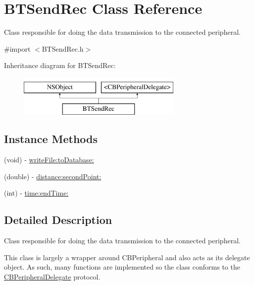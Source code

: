 \hypertarget{interfaceBTSendRec}{\section{B\-T\-Send\-Rec Class Reference}
\label{interfaceBTSendRec}
}


Class responsible for doing the data transmission to the connected peripheral.  




{\ttfamily \#import $<$B\-T\-Send\-Rec.\-h$>$}

Inheritance diagram for B\-T\-Send\-Rec\-:\begin{figure}[H]
\begin{center}
\leavevmode
\includegraphics[height=2.000000cm]{interfaceBTSendRec}
\end{center}
\end{figure}
\subsection*{Instance Methods}
\begin{DoxyCompactItemize}
\item 
(void) -\/ \hyperlink{interfaceBTSendRec_ac2435c7aa9df21d6d3ffc2b570c15fb7}{write\-File\-:to\-Database\-:}
\item 
(double) -\/ \hyperlink{interfaceBTSendRec_afebf4e21bbbc80a1fdd04f1d5920d258}{distance\-:second\-Point\-:}
\item 
(int) -\/ \hyperlink{interfaceBTSendRec_a2c40741a15aca7b2fae51be9e469ccd8}{time\-:end\-Time\-:}
\end{DoxyCompactItemize}


\subsection{Detailed Description}
Class responsible for doing the data transmission to the connected peripheral. 

This class is largely a wrapper around C\-B\-Peripheral and also acts as its delegate object. As such, many functions are implemented so the class conforms to the \hyperlink{classCBPeripheralDelegate-p}{C\-B\-Peripheral\-Delegate} protocol. 

